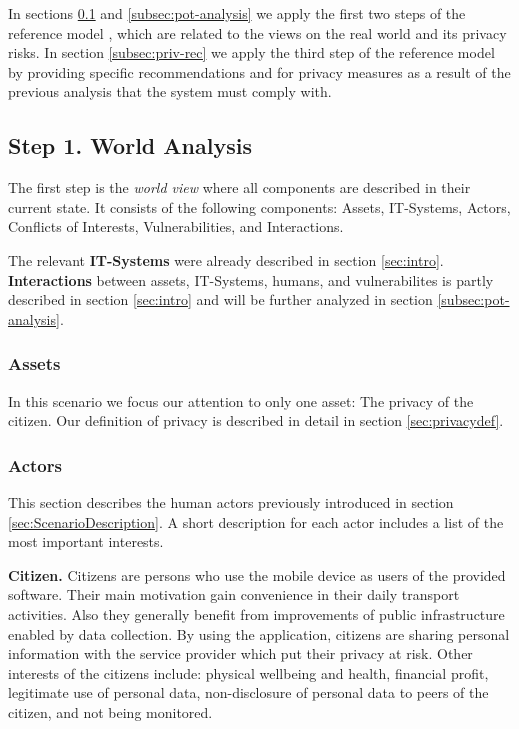 \documentclass[runningheads,a4paper]{llncs}
\begin{document}
In sections \ref{subsec:world-analysis} and \ref{subsec:pot-analysis} we apply the first two steps of the reference model \cite{Grimm:ItSecRefModel}, which are related to the views on the real world and its privacy risks. In section \ref{subsec:priv-rec} we apply the third step of the reference model by providing specific recommendations and for privacy measures as a result of the previous analysis that the system must comply with. 


\subsection{Step 1. World Analysis}

\label{subsec:world-analysis}

The first step is the \emph{world view} where all components are described in their current state. It consists of the following components: Assets, IT-Systems, Actors, Conflicts of Interests, Vulnerabilities, and Interactions.

The relevant \textbf{IT-Systems} were already described in section \ref{sec:intro}.
\textbf{Interactions} between assets, IT-Systems, humans, and vulnerabilites is partly described in section \ref{sec:intro} and will be further analyzed in section \ref{subsec:pot-analysis}.
	

\subsubsection{Assets}

In this scenario we focus our attention to only one asset: The privacy of the citizen. Our definition of privacy is described in detail in section \ref{sec:privacydef}.

\subsubsection{Actors}
\label{subsubsection:humans}

This section describes the human actors previously introduced in section \ref{sec:ScenarioDescription}. A short description for each actor includes a list of the most important interests.

\textbf{Citizen.}
Citizens are persons who use the mobile device as users of the provided software.
Their main motivation gain convenience in their daily transport activities.
Also they generally benefit from improvements of public infrastructure enabled by data collection.
By using the application, citizens are sharing personal information with the service provider which put their privacy at risk.
Other interests of the citizens include: physical wellbeing and health, financial profit, legitimate use of personal data, non-disclosure of personal data to peers of the citizen, and not being monitored.
\end{document}
